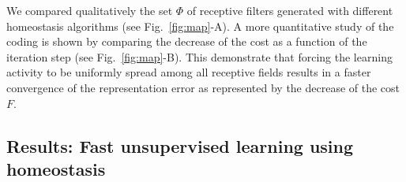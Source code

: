 \documentclass[draft]{article} %
\newcommand{\dico}{\Phi} %
\newcommand{\seeFig}[1]{Figure~\ref{fig:#1}}%
\begin{document}
We compared qualitatively the set $\dico$ of receptive filters generated with different homeostasis algorithms (see Fig.~\ref{fig:map}-A). A more quantitative study of the coding is shown by comparing the decrease of the cost as a function of the iteration step (see Fig.~\ref{fig:map}-B). This demonstrate that forcing the learning activity to be uniformly spread among all receptive fields results in a faster convergence of the representation error as represented by the decrease of the cost $F$. %
\subsection{Results: Fast unsupervised learning using homeostasis}\label{results}
\end{document}
